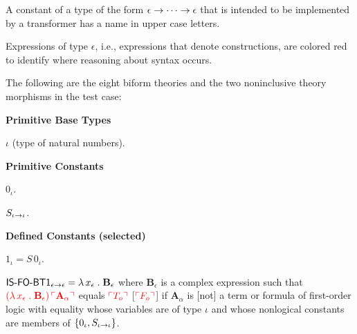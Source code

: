   \item A constant of a type of the form $\epsilon \rightarrow \cdots
    \rightarrow \epsilon$ that is intended to be implemented by a
    transformer has a name in upper case letters.

  \item Expressions of type $\epsilon$, i.e., expressions that denote
    constructions, are colored red to identify where reasoning about
    syntax occurs.

\ee

The following are the eight biform theories and the two noninclusive
theory morphisms in the test case:

\begin{biformthy}\em
\bi

  \item[] 

  \item[] \textbf{Primitive Base Types}

  \be

    \item $\iota$ (type of natural numbers).

  \ee

  \item[] \textbf{Primitive Constants}

  \be

    \item $0_\iota$.

    \item $S_{\iota \rightarrow \iota}$.

  \ee

  \item[] \textbf{Defined Constants (selected)}

  \be

    \item $1_\iota = S \, 0_\iota$.

    \item $\mbox{\sf IS-FO-BT1}_{\epsilon \rightarrow \epsilon} = \lambda\,
      x_\epsilon \mathrel. \textbf{B}_\epsilon$ {\sglsp} where
      $\textbf{B}_\epsilon$ is a complex expression such that
      $\textcolor{red}{(\lambda\, x_\epsilon \mathrel. \textbf{B}_\epsilon) \,
        \ulcorner\textbf{A}_\alpha\urcorner}$ equals $\textcolor{red}{\ulcorner T_o\urcorner}$
      [$\textcolor{red}{\ulcorner F_o\urcorner}$] if $\textbf{A}_\alpha$ is [not] a term
      or formula of first-order logic with equality whose variables
      are of type $\iota$ and whose nonlogical constants are members
      of ${\{ 0_\iota,S_{\iota \rightarrow \iota} \}}$.


\end{biformthy}
